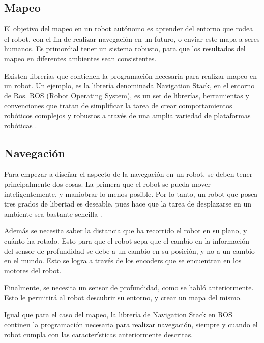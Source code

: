 \subsection{Mapeo}

El objetivo del mapeo en un robot autónomo es aprender del entorno que rodea el robot, con el fin de realizar navegación en un futuro, o enviar este mapa a seres humanos. Es primordial tener un sistema robusto, para que los resultados del mapeo en diferentes ambientes sean consistentes.

Existen librerías que contienen la programación necesaria para realizar mapeo en un robot. Un ejemplo, es la librería denominada Navigation Stack, en el entorno de Ros. ROS (Robot Operating System), es un set de librerías, herramientas y convenciones que tratan de simplificar la tarea de crear comportamientos robóticos complejos y robustos a través de una amplia variedad de plataformas robóticas \cite{Quigley2009}.


\subsection{Navegación}

Para empezar a diseñar el aspecto de la navegación en un robot, se deben tener principalmente dos cosas. La primera que el robot se pueda mover inteligentemente, y maniobrar lo menos posible. Por lo tanto, un robot que posea tres grados de libertad es deseable, pues hace que la tarea de desplazarse en un ambiente sea bastante sencilla \cite{Batlle2009}.

Además se necesita saber la distancia que ha recorrido el robot en su plano, y cuánto ha rotado. Esto para que el robot sepa que el cambio en la información del sensor de profundidad se debe a un cambio en su posición, y no a un cambio en el mundo. Esto se logra a través de los encoders que se encuentran en los motores del robot.

Finalmente, se necesita un sensor de profundidad, como se habló anteriormente. Esto le permitirá al robot descubrir su entorno, y crear un mapa del mismo.

Igual que para el caso del mapeo, la librería de Navigation Stack en ROS continen la programación necesaria para realizar navegación, siempre y cuando el robot cumpla con las características anteriormente descritas.

